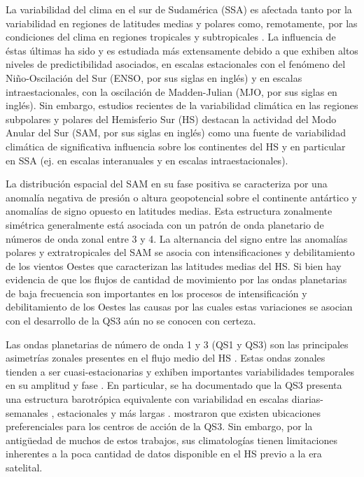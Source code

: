 \documentclass[spanish,a4paper,12pt,oneside]{book}
\begin{document}
La variabilidad del clima en el sur de Sudamérica (SSA) es afectada
tanto por la variabilidad en regiones de latitudes medias y polares
como, remotamente, por las condiciones del clima en regiones tropicales
y subtropicales \citep[ej.][]{Vera2006}. La influencia de éstas últimas
ha sido y es estudiada más extensamente debido a que exhiben altos
niveles de predictibilidad asociados, en escalas estacionales con el
fenómeno del Niño-Oscilación del Sur (ENSO, por sus siglas en inglés) y
en escalas intraestacionales, con la oscilación de Madden-Julian (MJO,
por sus siglas en inglés). Sin embargo, estudios recientes de la
variabilidad climática en las regiones subpolares y polares del
Hemisferio Sur (HS) destacan la actividad del Modo Anular del Sur (SAM,
por sus siglas en inglés) como una fuente de variabilidad climática de
significativa influencia sobre los continentes del HS y en particular en
SSA (ej. \citet{Silvestri2009} en escalas interanuales y
\citet{Alvarez2014} en escalas intraestacionales).

La distribución espacial del SAM en su fase positiva se caracteriza por
una anomalía negativa de presión o altura geopotencial sobre el
continente antártico y anomalías de signo opuesto en latitudes medias.
Esta estructura zonalmente simétrica generalmente está asociada con un
patrón de onda planetario de números de onda zonal entre 3 y 4. La
alternancia del signo entre las anomalías polares y extratropicales del
SAM se asocia con intensificaciones y debilitamiento de los vientos
Oestes que caracterizan las latitudes medias del HS. Si bien hay
evidencia de que los flujos de cantidad de movimiento por las ondas
planetarias de baja frecuencia son importantes en los procesos de
intensificación y debilitamiento de los Oestes
\citep{Lorenz2001, Simpson2013} las causas por las cuales estas
variaciones se asocian con el desarrollo de la QS3 aún no se conocen con
certeza.

Las ondas planetarias de número de onda 1 y 3 (QS1 y QS3) son las
principales asimetrías zonales presentes en el flujo medio del HS
\citep{Loon1972, Trenberth1980a}. Estas ondas zonales tienden a ser
cuasi-estacionarias y exhiben importantes variabilidades temporales en
su amplitud y fase \citep{Loon1972}. En particular, se ha documentado
que la QS3 presenta una estructura barotrópica equivalente con
variabilidad en escalas diarias-semanales \citep{Kidson1988},
estacionales \citep{Mo1985} y más largas \citep{Karoly1989}.
\citet{Mo1985} mostraron que existen ubicaciones preferenciales para los
centros de acción de la QS3. Sin embargo, por la antigüedad de muchos de
estos trabajos, sus climatologías tienen limitaciones inherentes a la
poca cantidad de datos disponible en el HS previo a la era satelital.
\end{document}
